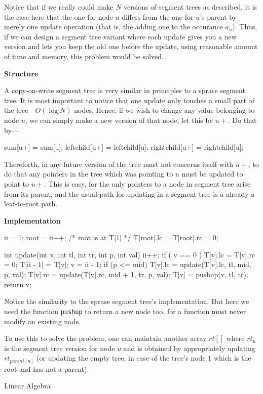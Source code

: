 {Notice that if we really could make $N$ versions of segment trees as described, it is the case here that
the one for node $u$ differs from the one for $u$'s parent by merely one update operation (that is, the
adding one to the occurance $a_u$).  Thus, if we can design a segment tree variant where
each update gives you a new version and lets you keep the old one before the update, using reasonable
amount of time and memory, this problem would be solved.

{\bf Structure}

A copy-on-write segment tree is very similar in principles to a sprase segment tree.  It is most important
to notice that one update only touches a small part of the tree---$O(\log N)$ nodes.  Hence,
if we wish to change any value belonging to node $u$, we can simply make a new version of that node,
let this be $u+$.  Do that by---

\begtt
  sum[u+] = sum[u]; 
  leftchild[u+] = leftchild[u];
  rightchild[u+] = rightchild[u];
\endtt

Thereforth, in any future version of the tree must not concerns itself with $u+$;
to do that any pointers in the tree which was pointing to $u$ must be updated to
point to $u+$.  This is easy, for the only pointers to a node in segment tree
arise from its parent, and the usual path for updating in a segment tree is a
already a leaf-to-root path.

{\bf Implementation}

\begtt
ii = 1;
root = ii++; /* root is at T[1] */
T[root].lc   =    T[root].rc = 0;

int update(int v, int tl, int tr, int p, int val) {
    ii++;
    if ( v == 0 ) {
        T[v].lc  =  T[v].rc  =  0;
      }
    T[ii - 1] = T[v];
    v = ii - 1;
    if (p <= mid) {
        T[v].lc = update(T[v].lc, tl, mid, p, val);
        T[v].rc = update(T[v].rc, mid + 1, tr, p, val);
      }
    T[v] = pushup(v, tl, tr);
    return v;
  }
\endtt

Notice the similarity to the sprase segment tree's implementation.  But here we need
the function {\tt pushup} to return a new node too, for a function must never modify an
existing node.

To use this to solve the problem, one can maintain another array $rt[]$ where
$rt_u$ is the segment tree version for node $u$ and is obtained by
appropriately updating $rt_{parent[u]}$ (or updating the empty tree, in case
of the tree's node $1$ which is the root and has not a parent).

\sec Linear Algebra

}
